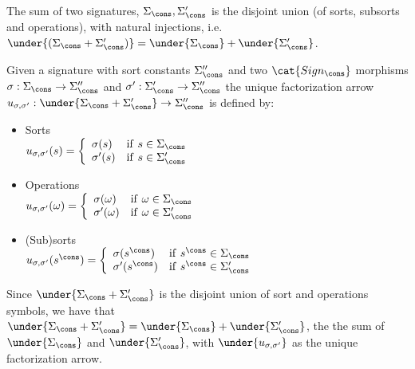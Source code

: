 \begin{lemma}
The sum of two signatures, $\Sigma_\cons,\Sigma'_\cons$ is the disjoint
union (of sorts, subsorts and operations), with natural injections,
i.e. $\under{(\Sigma_\cons + \Sigma'_\cons)} = \under{\Sigma_\cons} +
\under{\Sigma'_\cons}$.
\end{lemma}
%
\begin{PROOF}
Given a signature with sort constants $\Sigma''_\cons$ and two
$\cat{Sign_\cons}$ morphisms $\sigma: \Sigma_\cons \to
\Sigma''_\cons$ and  $\sigma': \Sigma'_\cons \to \Sigma''_\cons$ the unique
factorization arrow $u_{\sigma,\sigma'}:\under{\Sigma_\cons+\Sigma'_\cons}\to
\Sigma''_\cons$ is defined by:
\begin{itemize}
\item Sorts\\
$u_{\sigma,\sigma'}(s) = \left\{\begin{array}{ll}
		\sigma(s) & {\rm if\ } s \in \Sigma_\cons \\ 
		\sigma'(s) & {\rm if\ } s \in \Sigma'_\cons
 \end{array}\right.$	
\item Operations\\
$u_{\sigma,\sigma'}(\omega) = \left\{\begin{array}{ll}
		\sigma(\omega) & {\rm if\ } \omega \in \Sigma_\cons \\ 
		\sigma'(\omega) & {\rm if\ } \omega \in \Sigma'_\cons
 \end{array}\right.$
\item (Sub)sorts\\
$u_{\sigma,\sigma'}(s^\cons) = \left\{\begin{array}{ll}
		\sigma(s^\cons) & {\rm if\ } s^\cons \in \Sigma_\cons \\ 
		\sigma'(s^\cons) & {\rm if\ } s^\cons \in \Sigma'_\cons
 \end{array}\right.$
\end{itemize}
%
Since $\under{\Sigma_\cons + \Sigma'_\cons}$ is the disjoint union
of sort and operations symbols, we have that $\under{\Sigma_\cons +
\Sigma'_\cons} = \under{\Sigma_\cons} + \under{\Sigma'_\cons}$, the the sum of
$\under{\Sigma_\cons}$ and $\under{\Sigma'_\cons}$, with
$\under{u_{\sigma,\sigma'}}$ as the unique factorization arrow.
\end{PROOF}

